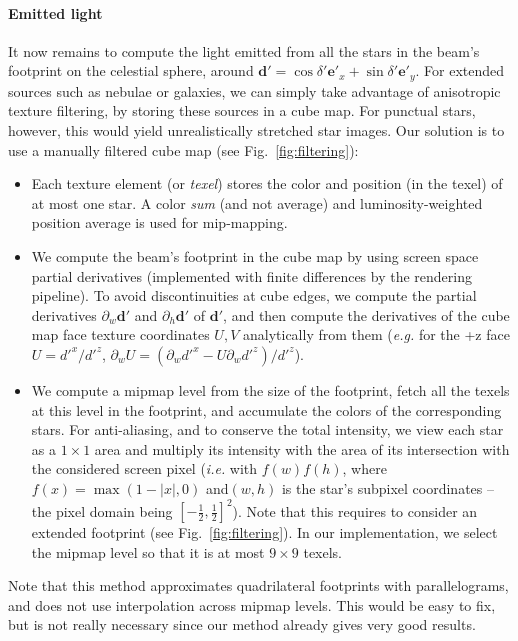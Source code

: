 \documentclass{document}
\begin{document}
\paragraph*{Emitted light} It now remains to compute the light emitted from all 
the stars in the beam's footprint on the celestial sphere, around $\mathbf{d}' 
= \cos\delta' \mathbf{e}'_x + \sin\delta' \mathbf{e}'_y$. For extended sources 
such as nebulae or galaxies, we can simply take advantage of anisotropic 
texture filtering, by storing these sources in a cube map. For punctual stars, 
however, this would yield unrealistically stretched star images. Our solution 
is to use a manually filtered cube map (see Fig.~\ref{fig:filtering}):
\begin{itemize}
	\item Each texture element (or {\em texel}) stores the color and position 
	(in the texel) of at most one star. A color {\em sum} (and not average) 
	and luminosity-weighted position average is used for mip-mapping.
	\item We compute the beam's footprint in the cube map by using screen space 
	partial derivatives (implemented with finite differences by the rendering 
	pipeline). To avoid discontinuities at cube edges, we compute the partial 
	derivatives $\partial_w \mathbf{d}'$ and $\partial_h \mathbf{d}'$ of 
	$\mathbf{d}'$, and then compute the derivatives of the cube map face texture 
	coordinates $U, V$ analytically from them ({\em e.g.} for the +z face $U = 
	d'^x / d'^z$, $\partial_w U = (\partial_w d'^x - U\partial_w d'^z) / d'^z$).
	\item We compute a mipmap level from the size of the footprint, fetch all the 
	texels at this level in the footprint, and accumulate the colors of the	
	corresponding stars. For anti-aliasing, and to conserve the total intensity, 
	we view each star as a $1\times 1$ area and multiply its intensity with the 
	area of its intersection with the considered screen pixel ({\em i.e.} with 
	$f(w)f(h)$, where $f(x) = \max(1 - |x|, 0)$ and$(w, h)$ is the star's 
	subpixel coordinates -- the pixel domain being $[-\frac{1}{2}, 
	\frac{1}{2}]^2$). Note that this requires to consider an extended footprint 
	(see Fig.~\ref{fig:filtering}). In our implementation, we select the mipmap 
	level so that it is at most $9 \times 9$ texels. 
\end{itemize}
Note that this method approximates quadrilateral footprints with 
parallelograms, and does not use interpolation across mipmap levels. This would 
be easy to fix, but is not really necessary since our method already gives very 
good results.
\end{document}
